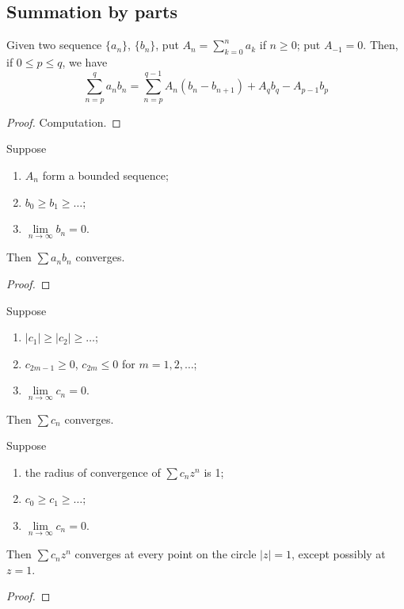\subsection{Summation by parts}

\begin{theorem}
[pma 3.41]
Given two sequence $\{a_n\}$, $\{b_n\}$, put $A_n=\sum\limits_{k=0}^{n}a_k$ if $n\geq 0$; put $A_{-1}=0$. Then, if $0\leq p\leq q$, we have
$$\sum_{n=p}^qa_nb_n=\sum_{n=p}^{q-1}A_n(b_n-b_{n+1})+A_qb_q-A_{p-1}b_p$$
\end{theorem}
\begin{proof}
Computation.
\end{proof}

\begin{theorem}
[pma 3.42]
Suppose
\begin{enumerate}[label={(\alph*)}]
\item $A_n$ form a bounded sequence;
\item $b_0\geq b_1\geq \dots$;
\item $\lim\limits_{n\to \infty}b_n=0$.
\end{enumerate}
Then $\sum a_nb_n$ converges.
\end{theorem}
\begin{proof}

\end{proof}

\begin{corollary}
[pma 3.43]
Suppose
\begin{enumerate}[label={(\alph*)}]
\item $|c_1|\geq |c_2|\geq \dots$;
\item $c_{2m-1}\geq 0$, $c_{2m}\leq 0$ for $m=1,2,\dots$;
\item $\lim\limits_{n\to \infty}c_n=0$.
\end{enumerate}
Then $\sum c_n$ converges.    
\end{corollary}

\begin{theorem}
[pma 3.44]
Suppose
\begin{enumerate}[label={(\alph*)}]
\item the radius of convergence of $\sum c_nz^n$ is 1;
\item $c_0\geq c_1\geq \dots$;
\item $\lim\limits_{n\to \infty}c_n=0$.
\end{enumerate}
Then $\sum c_nz^n$ converges at every point on the circle $|z|=1$, except possibly at $z=1$.
\end{theorem}
\begin{proof}

\end{proof}

